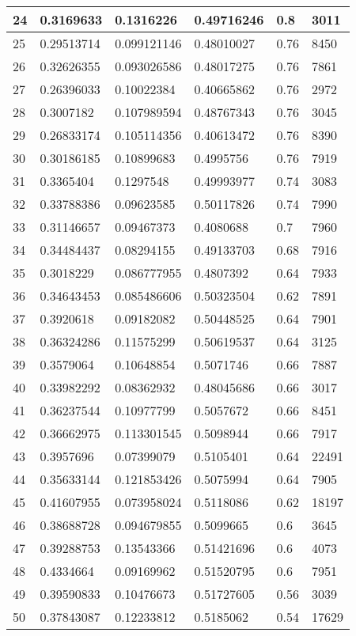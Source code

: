 \begin{longtable}{|l|l|l|l|l|l|}
24 & 0.3169633 & 0.1316226 & 0.49716246 & 0.8 & 3011 \\ \hline 
25 & 0.29513714 & 0.099121146 & 0.48010027 & 0.76 & 8450 \\ \hline 
26 & 0.32626355 & 0.093026586 & 0.48017275 & 0.76 & 7861 \\ \hline 
27 & 0.26396033 & 0.10022384 & 0.40665862 & 0.76 & 2972 \\ \hline 
28 & 0.3007182 & 0.107989594 & 0.48767343 & 0.76 & 3045 \\ \hline 
29 & 0.26833174 & 0.105114356 & 0.40613472 & 0.76 & 8390 \\ \hline 
30 & 0.30186185 & 0.10899683 & 0.4995756 & 0.76 & 7919 \\ \hline 
31 & 0.3365404 & 0.1297548 & 0.49993977 & 0.74 & 3083 \\ \hline 
32 & 0.33788386 & 0.09623585 & 0.50117826 & 0.74 & 7990 \\ \hline 
33 & 0.31146657 & 0.09467373 & 0.4080688 & 0.7 & 7960 \\ \hline 
34 & 0.34484437 & 0.08294155 & 0.49133703 & 0.68 & 7916 \\ \hline 
35 & 0.3018229 & 0.086777955 & 0.4807392 & 0.64 & 7933 \\ \hline 
36 & 0.34643453 & 0.085486606 & 0.50323504 & 0.62 & 7891 \\ \hline 
37 & 0.3920618 & 0.09182082 & 0.50448525 & 0.64 & 7901 \\ \hline 
38 & 0.36324286 & 0.11575299 & 0.50619537 & 0.64 & 3125 \\ \hline 
39 & 0.3579064 & 0.10648854 & 0.5071746 & 0.66 & 7887 \\ \hline 
40 & 0.33982292 & 0.08362932 & 0.48045686 & 0.66 & 3017 \\ \hline 
41 & 0.36237544 & 0.10977799 & 0.5057672 & 0.66 & 8451 \\ \hline 
42 & 0.36662975 & 0.113301545 & 0.5098944 & 0.66 & 7917 \\ \hline 
43 & 0.3957696 & 0.07399079 & 0.5105401 & 0.64 & 22491 \\ \hline 
44 & 0.35633144 & 0.121853426 & 0.5075994 & 0.64 & 7905 \\ \hline 
45 & 0.41607955 & 0.073958024 & 0.5118086 & 0.62 & 18197 \\ \hline 
46 & 0.38688728 & 0.094679855 & 0.5099665 & 0.6 & 3645 \\ \hline 
47 & 0.39288753 & 0.13543366 & 0.51421696 & 0.6 & 4073 \\ \hline 
48 & 0.4334664 & 0.09169962 & 0.51520795 & 0.6 & 7951 \\ \hline 
49 & 0.39590833 & 0.10476673 & 0.51727605 & 0.56 & 3039 \\ \hline 
50 & 0.37843087 & 0.12233812 & 0.5185062 & 0.54 & 17629 \\ \hline 
\end{longtable}